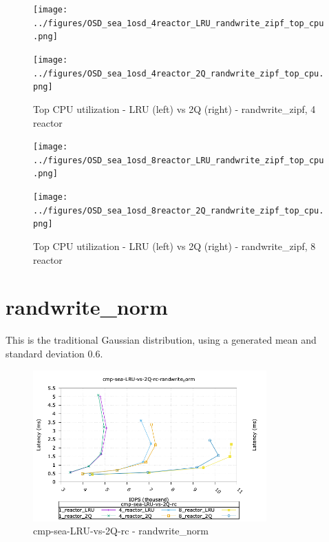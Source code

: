 \begin{figure}[!ht]
  \centering
  \begin{minipage}{.5\textwidth}
  \centering
    \texttt{[image: ../figures/OSD\_sea\_1osd\_4reactor\_LRU\_randwrite\_zipf\_top\_cpu.png]}
  \end{minipage}%
  \begin{minipage}{.5\textwidth}
  \centering
    \texttt{[image: ../figures/OSD\_sea\_1osd\_4reactor\_2Q\_randwrite\_zipf\_top\_cpu.png]}
  \end{minipage}%
  \caption{Top CPU utilization - LRU (left) vs 2Q (right) - randwrite\_zipf, 4 reactor}
  \label{figure:4-reactor-cpu-randwrite_zipf}
\end{figure}


\begin{figure}[!ht]
  \centering
  \begin{minipage}{.5\textwidth}
  \centering
    \texttt{[image: ../figures/OSD\_sea\_1osd\_8reactor\_LRU\_randwrite\_zipf\_top\_cpu.png]}
  \end{minipage}%
  \begin{minipage}{.5\textwidth}
  \centering
    \texttt{[image: ../figures/OSD\_sea\_1osd\_8reactor\_2Q\_randwrite\_zipf\_top\_cpu.png]}
  \end{minipage}%
  \caption{Top CPU utilization - LRU (left) vs 2Q (right) - randwrite\_zipf, 8 reactor}
  \label{figure:8-reactor-cpu-randwrite_zipf}
\end{figure}


\pagebreak
\section{randwrite\_norm}

This is the traditional Gaussian distribution, using a generated mean and standard deviation 0.6.

\begin{figure}[!ht]
\centering
\includegraphics[width=0.8\textwidth]{../figures/cmp_sea_LRU_vs_2Q_rc_randwrite_norm_iops_vs_lat.png}
\caption{cmp-sea-LRU-vs-2Q-rc - randwrite\_norm}
\label{fig:cmp_sea_LRU_vs_2Q_rc_randwrite_norm}
\end{figure}


